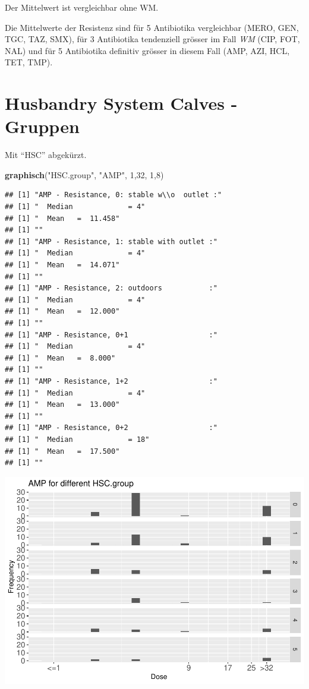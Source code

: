 \documentclass[
]{article}
\newenvironment{Shaded}{\begin{snugshade}}{\end{snugshade}}
\newcommand{\DecValTok}[1]{\textcolor[rgb]{0.00,0.00,0.81}{#1}}
\newcommand{\KeywordTok}[1]{\textcolor[rgb]{0.13,0.29,0.53}{\textbf{#1}}}
\newcommand{\NormalTok}[1]{#1}
\newcommand{\StringTok}[1]{\textcolor[rgb]{0.31,0.60,0.02}{#1}}
\begin{document}
Der Mittelwert ist vergleichbar ohne WM.

Die Mittelwerte der Resistenz sind für 5 Antibiotika vergleichbar (MERO,
GEN, TGC, TAZ, SMX), für 3 Antibiotika tendenziell grösser im Fall
\emph{WM} (CIP, FOT, NAL) und für 5 Antibiotika definitiv grösser in
diesem Fall (AMP, AZI, HCL, TET, TMP).

\hypertarget{husbandry-system-calves---gruppen}{%
\section{Husbandry System Calves -
Gruppen}\label{husbandry-system-calves---gruppen}}

Mit ``HSC'' abgekürzt.

\begin{Shaded}
\begin{Highlighting}[]
  \KeywordTok{graphisch}\NormalTok{(}\StringTok{"HSC.group"}\NormalTok{, }\StringTok{"AMP"}\NormalTok{, }\DecValTok{1}\NormalTok{,}\DecValTok{32}\NormalTok{, }\DecValTok{1}\NormalTok{,}\DecValTok{8}\NormalTok{)}
\end{Highlighting}
\end{Shaded}

\begin{verbatim}
## [1] "AMP - Resistance, 0: stable w\\o  outlet :"
## [1] "  Median             = 4"
## [1] "  Mean   =  11.458"
## [1] ""
## [1] "AMP - Resistance, 1: stable with outlet :"
## [1] "  Median             = 4"
## [1] "  Mean   =  14.071"
## [1] ""
## [1] "AMP - Resistance, 2: outdoors           :"
## [1] "  Median             = 4"
## [1] "  Mean   =  12.000"
## [1] ""
## [1] "AMP - Resistance, 0+1                   :"
## [1] "  Median             = 4"
## [1] "  Mean   =  8.000"
## [1] ""
## [1] "AMP - Resistance, 1+2                   :"
## [1] "  Median             = 4"
## [1] "  Mean   =  13.000"
## [1] ""
## [1] "AMP - Resistance, 0+2                   :"
## [1] "  Median             = 18"
## [1] "  Mean   =  17.500"
## [1] ""
\end{verbatim}

\includegraphics{Verteilungen_files/figure-latex/unnamed-chunk-44-1.pdf}
\end{document}
